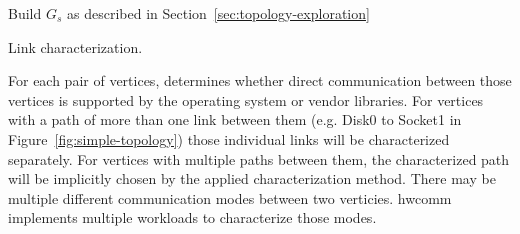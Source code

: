 \begin{algorithm}[ht]
    \SetAlgoLined
     Build $G_s$ as described in Section~\ref{sec:topology-exploration}\;
     \caption{Link characterization.}
     \label{alg:link-char}
\end{algorithm}

For each pair of vertices,  determines whether direct communication between those vertices is supported by the operating system or vendor libraries.
For vertices with a path of more than one link between them (e.g. Disk0 to Socket1 in Figure~\ref{fig:simple-topology}) those individual links will be characterized separately.
For vertices with multiple paths between them, the characterized path will be implicitly chosen by the applied characterization method.
There may be multiple different communication modes between two verticies.
hwcomm implements multiple workloads to characterize those modes.

